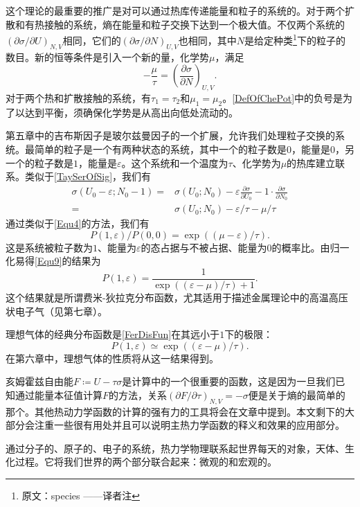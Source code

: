 这个理论的最重要的推广是对可以通过热库传递能量和粒子的系统的。对于两个扩散和有热接触的系统，熵在能量和粒子交换下达到一个极大值。不仅两个系统的$(\partial\sigma/\partial U)_{N,V}$相同，它们的$(\partial\sigma/\partial N)_{U,V}$也相同，其中$N$是给定种类\footnote{原文：species ——译者注}下的粒子的数目。新的恒等条件是引入一个新的量，化学势$\mu$，满足
\begin{equation}
    -\frac{\mu}{\tau}=\left( \frac{\partial \sigma}{\partial N} \right) _{U,V}.\label{DefOfChePot}
\end{equation}
对于两个热和扩散接触的系统，有$\tau_1=\tau_2$和$\mu_1=\mu_2$。\eqref{DefOfChePot}中的负号是为了以达到平衡，须确保化学势是从高出向低处流动的。

第五章中的吉布斯因子是玻尔兹曼因子的一个扩展，允许我们处理粒子交换的系统。最简单的粒子是一个有两种状态的系统，其中一个的粒子数是$0$，能量是$0$，另一个的粒子数是$1$，能量是$\varepsilon$。这个系统和一个温度为$\tau$、化学势为$\mu$的热库建立联系。类似于\eqref{TaySerOfSig}，我们有
\begin{equation}
    \begin{aligned}
        \sigma \left( U_0-\varepsilon ;N_0-1 \right) =&\sigma \left( U_0;N_0 \right) -\varepsilon \frac{\partial \sigma}{\partial U_0}-1\cdot \frac{\partial \sigma}{\partial N_0}
        \\
        =&\sigma \left( U_0;N_0 \right) -\varepsilon /\tau -\mu /\tau 
    \end{aligned}
\end{equation}
通过类似于\eqref{Equ4}的方法，我们有
\begin{equation}
    P(1,\varepsilon)/P(0,0)=\exp((\mu-\varepsilon)/\tau).\label{Equ9}
\end{equation}
这是系统被粒子数为$1$、能量为$\varepsilon$的态占据与不被占据、能量为$0$的概率比。由归一化易得\eqref{Equ9}的结果为
\begin{equation}
    P(1,\varepsilon)=\frac{1}{\exp((\varepsilon-\mu)/\tau)+1}.\label{FerDisFun}
\end{equation}
这个结果就是所谓费米-狄拉克分布函数，尤其适用于描述金属理论中的高温高压状电子气（见第七章）。

理想气体的经典分布函数是\eqref{FerDisFun}在其远小于$1$下的极限：
\begin{equation}
    P(1,\varepsilon)\simeq\exp((\varepsilon-\mu)/\tau).
\end{equation}
在第六章中，理想气体的性质将从这一结果得到。

亥姆霍兹自由能$F\coloneqq U-\tau\sigma$是计算中的一个很重要的函数，这是因为一旦我们已知通过能量本征值计算$F$的方法，关系$(\partial F/\partial\tau)_{N,V}=-\sigma$便是关于熵的最简单的那个。其他热动力学函数的计算的强有力的工具将会在文章中提到。本文剩下的大部分会注重一些很有用处并且可以说明主热力学函数的释义和效果的应用部分。

通过分子的、原子的、电子的系统，热力学物理联系起世界每天的对象，天体、生化过程。它将我们世界的两个部分联合起来：微观的和宏观的。
